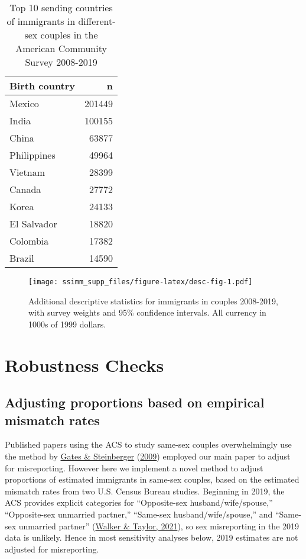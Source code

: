 \documentclass[
  11pt,
]{article}
\begin{document}
\begin{table}

\caption{\label{tab:desc-top2}Top 10 sending countries of immigrants in different-sex couples in the American Community Survey 2008-2019}
\centering
\begin{tabular}[t]{lr}
\toprule
Birth country & n\\
\midrule
Mexico & 201449\\
India & 100155\\
China & 63877\\
Philippines & 49964\\
Vietnam & 28399\\
\addlinespace
Canada & 27772\\
Korea & 24133\\
El Salvador & 18820\\
Colombia & 17382\\
Brazil & 14590\\
\bottomrule
\end{tabular}
\end{table}

\begin{figure}
\centering
\texttt{[image: ssimm\_supp\_files/figure-latex/desc-fig-1.pdf]}
\caption{\label{fig:desc-fig}Additional descriptive statistics for immigrants in couples 2008-2019, with survey weights and 95\% confidence intervals. All currency in 1000s of 1999 dollars.}
\end{figure}

\newpage

\hypertarget{robustness-checks}{%
\section{Robustness Checks}\label{robustness-checks}}

\hypertarget{adjusting-proportions-based-on-empirical-mismatch-rates}{%
\subsection{Adjusting proportions based on empirical mismatch rates}\label{adjusting-proportions-based-on-empirical-mismatch-rates}}

Published papers using the ACS to study same-sex couples overwhelmingly use the method by \protect\hyperlink{ref-gates_2009}{Gates \& Steinberger} (\protect\hyperlink{ref-gates_2009}{2009}) employed our main paper to adjust for misreporting. However here we implement a novel method to adjust proportions of estimated immigrants in same-sex couples, based on the estimated mismatch rates from two U.S. Census Bureau studies. Beginning in 2019, the ACS provides explicit categories for ``Opposite-sex husband/wife/spouse,'' ``Opposite-sex unmarried partner,'' ``Same-sex husband/wife/spouse,'' and ``Same-sex unmarried partner'' (\protect\hyperlink{ref-walker_2021}{Walker \& Taylor, 2021}), so sex misreporting in the 2019 data is unlikely. Hence in most sensitivity analyses below, 2019 estimates are not adjusted for misreporting.
\end{document}
